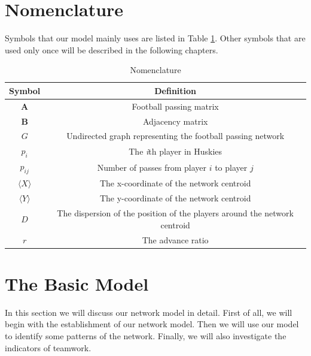 \documentclass{mcmthesis}
\begin{document}
\section{Nomenclature}
	Symbols that our model mainly uses are listed in Table \ref{tab:Nomen}.  Other symbols that are used only once will be described in the following chapters.
	\begin{table}
    	\centering
    	\caption{Nomenclature}
		\label{tab:Nomen}
		\begin{tabular}{c c}
			\hline	
				Symbol & Definition\\
			\hline
				$\textbf{A}$ & Football passing matrix\\
				$\textbf{B}$ & Adjacency matrix\\
				$G$ & Undirected graph representing the football passing network\\
				$p_{i}$ & The \emph{i}th player in Huskies\\
				$p_{ij}$ & Number of passes from player $i$ to player $j$\\
				$\langle$$X$$\rangle$ & The x-coordinate of the network centroid\\
				$\langle$$Y$$\rangle$ & The y-coordinate of the network centroid\\
				$D$ & The dispersion of the position of the players around the network centroid\\
				$r$ & The advance ratio\\
			\hline
   	 	\end{tabular}
	\end{table}

\section{The Basic Model}
	In this section we will discuss our network model in detail.  First of all, we will begin with the establishment of our network model.  Then we will use our model to identify some patterns of the network.  Finally, we will also investigate the indicators of teamwork. 
\end{document}
